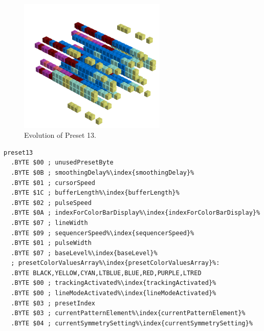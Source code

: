 \clearpage
\vspace*{-0.5cm}
\begin{minipage}[b]{0.48\linewidth}


                                                                 
\begin{figure}[H]                                                          
  \centering                                                             
  \begin{adjustbox}{width=7cm,center}                                   
  \includegraphics[width=7cm]{src/presets/pattern13-45.png}%
  \end{adjustbox}                                                        
\caption{Evolution of Preset 13.}                                           
\end{figure}                                                               
                                                                 
                                                                           
\end{minipage}
\hspace{0.1cm}
\begin{minipage}[b]{0.48\linewidth}                                       
\begin{lstlisting}[basicstyle=\ttfamily\scriptsize,caption=Data structure for Preset 13.,escapechar=\%]
preset13
  .BYTE $00 ; unusedPresetByte
  .BYTE $0B ; smoothingDelay%\index{smoothingDelay}%
  .BYTE $01 ; cursorSpeed
  .BYTE $1C ; bufferLength%\index{bufferLength}%
  .BYTE $02 ; pulseSpeed
  .BYTE $0A ; indexForColorBarDisplay%\index{indexForColorBarDisplay}%
  .BYTE $07 ; lineWidth
  .BYTE $09 ; sequencerSpeed%\index{sequencerSpeed}%
  .BYTE $01 ; pulseWidth
  .BYTE $07 ; baseLevel%\index{baseLevel}%
  ; presetColorValuesArray%\index{presetColorValuesArray}%: 
  .BYTE BLACK,YELLOW,CYAN,LTBLUE,BLUE,RED,PURPLE,LTRED
  .BYTE $00 ; trackingActivated%\index{trackingActivated}%
  .BYTE $00 ; lineModeActivated%\index{lineModeActivated}%
  .BYTE $03 ; presetIndex
  .BYTE $03 ; currentPatternElement%\index{currentPatternElement}%
  .BYTE $04 ; currentSymmetrySetting%\index{currentSymmetrySetting}%
\end{lstlisting}
\end{minipage}

